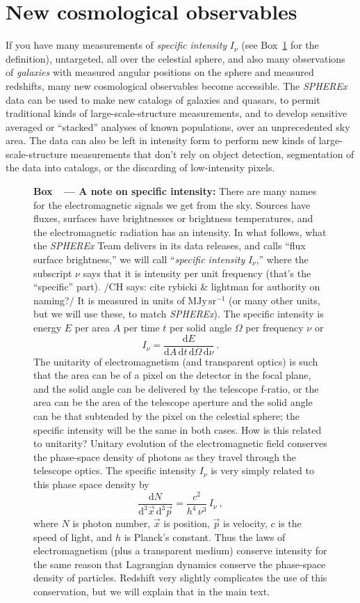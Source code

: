 \documentclass[12pt]{article}
\newcommand{\paragraphskip}{\medskip}
\renewcommand{\paragraph}[1]{\par\paragraphskip\noindent\textbf{#1}}
\newcounter{box}
\newcommand{\boxname}{Box}
\newcommand{\boxref}[1]{\boxname~\ref{#1}}
\newenvironment{explainer}[1][something random]{\begin{figure}[b!]\begin{mdframed}[roundcorner=2pt, backgroundcolor=black!05]\refstepcounter{box}\paragraph{\boxname~\thebox\ --- {#1}:}}{\end{mdframed}\end{figure}}
\newcommand{\dd}{\mathrm{d}}
\newcommand{\unit}[1]{\mathrm{#1}}
\newcommand{\Mega}{\unit{M}}
\newcommand{\Jy}{\unit{Jy}}
\newcommand{\sr}{\unit{sr}}
\newcommand{\MJypsr}{\Mega\Jy\,\sr^{-1}}
\newcommand{\CH}[1]{{\color{blue!70!black} /CH says: #1/}}
\begin{document}
\section*{New cosmological observables}
If you have many measurements of \emph{specific intensity} $I_\nu$ (see \boxref{box:intensity} for the definition), untargeted, all over the celestial sphere, and also many observations of \emph{galaxies} with measured angular positions on the sphere and measured redshifts, many new cosmological observables become accessible.
The \textsl{SPHEREx} data can be used to make new catalogs of galaxies and quasars, to permit traditional kinds of large-scale-structure measurements, and to develop sensitive averaged or ``stacked'' analyses of known populations, over an unprecedented sky area.
The data can also be left in intensity form to perform new kinds of large-scale-structure measurements that don't rely on object detection, segmentation of the data into catalogs, or the discarding of low-intensity pixels.
\begin{explainer}[A note on specific intensity]
    There are many names for the electromagnetic signals we get from the sky.
    Sources have fluxes, surfaces have brightnesses or brightness temperatures, and the electromagnetic radiation has an intensity.
    In what follows, what the \textsl{SPHEREx} Team delivers in its data releases, and calls ``flux surface brightness,'' we will call ``\emph{specific intensity} $I_\nu$,'' where the subscript $\nu$ says that it is intensity per unit frequency (that's the ``specific'' part).
    \CH{cite rybicki \& lightman for authority on naming?}
    It is measured in units of $\MJypsr$ (or many other units, but we will use these, to match \textsl{SPHEREx}).
    The specific intensity is energy $E$ per area $A$ per time $t$ per solid angle $\Omega$ per frequency $\nu$ or 
    $$ I_\nu = \frac{\dd E}{\dd A\,\dd t\,\dd\Omega\,\dd\nu} ~. $$
    The unitarity of electromagnetism (and transparent optics) is such that the area can be of a pixel on the detector in the focal plane, and the solid angle can be delivered by the telescope f-ratio, or the area can be the area of the telescope aperture and the solid angle can be that subtended by the pixel on the celestial sphere; the specific intensity will be the same in both cases.
    How is this related to unitarity?
    Unitary evolution of the electromagnetic field conserves the phase-space density of photons as they travel through the telescope optics.
    The specific intensity $I_\nu$ is very simply related to this phase space density by
    $$ \frac{\dd N}{\dd^3\vec{x}\,\dd^3\vec{p}} = \frac{c^2}{h^4\,\nu^3}\,I_\nu ~, $$
    where $N$ is photon number, $\vec{x}$ is position, $\vec{p}$ is velocity, $c$ is the speed of light, and $h$ is Planck's constant.
    Thus the laws of electromagnetism (plus a transparent medium) conserve intensity for the same reason that Lagrangian dynamics conserve the phase-space density of particles.
    Redshift very slightly complicates the use of this conservation, but we will explain that in the main text.
    \label{box:intensity}
\end{explainer}
\end{document}
